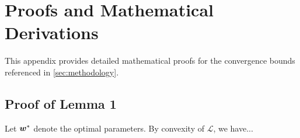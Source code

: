 \appendix
\section{Proofs and Mathematical Derivations}
\label{sec:appendix_proofs}

This appendix provides detailed mathematical proofs for the convergence bounds referenced in \cref{sec:methodology}.

\subsection{Proof of Lemma 1}
Let $\boldsymbol{w}^*$ denote the optimal parameters. By convexity of $\mathcal{L}$, we have...
